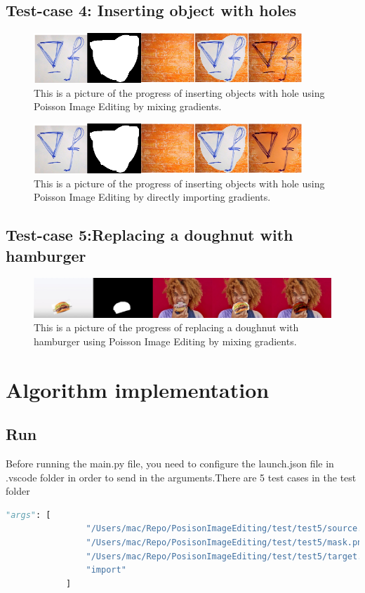 \documentclass[10pt, a4paper]{article}%
\begin{document}
 \subsection{Test-case 4: Inserting object with holes}
 \begin{figure}[H]
     \centering
     \includegraphics[width=0.9\textwidth]{merged_result_mix.png}
     \caption{This is a picture of the progress of inserting objects with hole using Poisson Image Editing by mixing gradients.}
     \label{fig:my_label}
 \end{figure}
  \begin{figure}[H]
     \centering
     \includegraphics[width=0.9\textwidth]{merged_result_import.png}
     \caption{This is a picture of the progress of inserting objects with hole using Poisson Image Editing by directly importing gradients.}
     \label{fig:my_label}
 \end{figure}
 \subsection{Test-case 5:Replacing a doughnut with hamburger}
 \begin{figure}[H]
     \centering
     \includegraphics[width=1.1\textwidth]{progress_import.jpg}
     \caption{This is a picture of the progress of replacing a doughnut with hamburger using Poisson Image Editing by mixing gradients.}
     \label{fig:my_label}
 \end{figure}
 \newpage
 \section{Algorithm implementation}
 \subsection{Run}
 Before running the main.py file, you need to configure the launch.json file in .vscode folder in order to send in the arguments.There are 5 test cases in the test folder
 \begin{lstlisting}[language=python]
 "args": [
                "/Users/mac/Repo/PosisonImageEditing/test/test5/source.png",
                "/Users/mac/Repo/PosisonImageEditing/test/test5/mask.png",
                "/Users/mac/Repo/PosisonImageEditing/test/test5/target.jpg",
                "import"
            ]
 \end{lstlisting}
\end{document}

